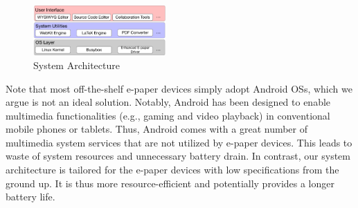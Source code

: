 \documentclass[]{sigchi}
\begin{document}

\begin{figure}[h]
\begin{center}
\includegraphics[width=0.45\textwidth]{figures/firefoxos}
\caption{System Architecture}
\label{fig:editingexample}
\end{center}
\end{figure}


Note that most off-the-shelf e-paper devices simply adopt Android OSs, which we argue is not an ideal solution.
Notably, Android has been designed to enable multimedia functionalities (e.g., gaming and video playback) in conventional mobile phones or tablets. Thus, Android comes with a great number of multimedia system services that are not utilized by e-paper devices. This leads to waste of system resources and unnecessary battery drain. In contrast, our system architecture is tailored for the e-paper devices with low specifications from the ground up. It is thus more resource-efficient and potentially provides a longer battery life.	



\end{document}
